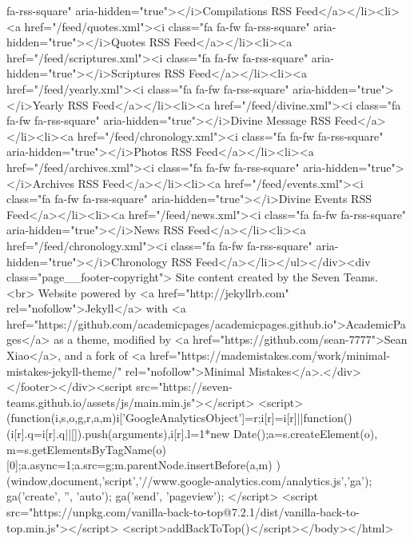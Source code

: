 fa-rss-square" aria-hidden="true"></i>Compilations RSS Feed</a></li><li><a href="/feed/quotes.xml"><i class="fa fa-fw fa-rss-square" aria-hidden="true"></i>Quotes RSS Feed</a></li><li><a href="/feed/scriptures.xml"><i class="fa fa-fw fa-rss-square" aria-hidden="true"></i>Scriptures RSS Feed</a></li><li><a href="/feed/yearly.xml"><i class="fa fa-fw fa-rss-square" aria-hidden="true"></i>Yearly RSS Feed</a></li><li><a href="/feed/divine.xml"><i class="fa fa-fw fa-rss-square" aria-hidden="true"></i>Divine Message RSS Feed</a></li><li><a href="/feed/chronology.xml"><i class="fa fa-fw fa-rss-square" aria-hidden="true"></i>Photos RSS Feed</a></li><li><a href="/feed/archives.xml"><i class="fa fa-fw fa-rss-square" aria-hidden="true"></i>Archives RSS Feed</a></li><li><a href="/feed/events.xml"><i class="fa fa-fw fa-rss-square" aria-hidden="true"></i>Divine Events RSS Feed</a></li><li><a href="/feed/news.xml"><i class="fa fa-fw fa-rss-square" aria-hidden="true"></i>News RSS Feed</a></li><li><a href="/feed/chronology.xml"><i class="fa fa-fw fa-rss-square" aria-hidden="true"></i>Chronology RSS Feed</a></li></ul></div><div class="page__footer-copyright"> Site content created by the Seven Teams. <br> Website powered by <a href="http://jekyllrb.com" rel="nofollow">Jekyll</a> with <a href="https://github.com/academicpages/academicpages.github.io">AcademicPages</a> as a theme, modified by <a href="https://github.com/sean-7777">Sean Xiao</a>, and a fork of <a href="https://mademistakes.com/work/minimal-mistakes-jekyll-theme/" rel="nofollow">Minimal Mistakes</a>.</div></footer></div><script src="https://seven-teams.github.io/assets/js/main.min.js"></script> <script> (function(i,s,o,g,r,a,m){i['GoogleAnalyticsObject']=r;i[r]=i[r]||function(){ (i[r].q=i[r].q||[]).push(arguments)},i[r].l=1*new Date();a=s.createElement(o), m=s.getElementsByTagName(o)[0];a.async=1;a.src=g;m.parentNode.insertBefore(a,m) })(window,document,'script','//www.google-analytics.com/analytics.js','ga'); ga('create', '', 'auto'); ga('send', 'pageview'); </script> <script src="https://unpkg.com/vanilla-back-to-top@7.2.1/dist/vanilla-back-to-top.min.js"></script> <script>addBackToTop()</script></body></html>
